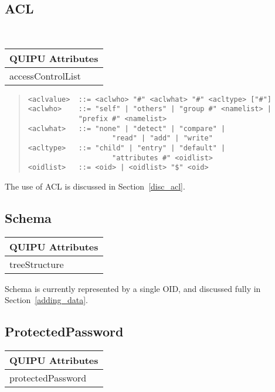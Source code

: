 \subsection{ACL}
\label{acl_syntax}
\
\begin{center}\small
\begin{tabular}{|l|}\hline
QUIPU Attributes \\ \hline
	accessControlList\\
\hline
\end{tabular}
\end{center}
\begin{quote}\begin{verbatim}
<aclvalue>	::= <aclwho> "#" <aclwhat> "#" <acltype> ["#"]
<aclwho>	::= "self" | "others" | "group #" <namelist> | 
			"prefix #" <namelist>
<aclwhat>	::= "none" | "detect" | "compare" | 
                    "read" | "add" | "write"
<acltype>	::= "child" | "entry" | "default" | 
                    "attributes #" <oidlist>
<oidlist>	::= <oid> | <oidlist> "$" <oid>
\end{verbatim}\end{quote}
The use of ACL is discussed in Section~\ref{disc_acl}.

\subsection{Schema}
\label{tree_struct}
\begin{center}\small
\begin{tabular}{|l|}\hline
QUIPU Attributes \\ \hline
	treeStructure\\
\hline
\end{tabular}
\end{center}
Schema is currently represented by a single OID, and discussed fully in
Section~\ref{adding_data}.

\subsection{ProtectedPassword}
\begin{center}\small
\begin{tabular}{|l|}\hline
QUIPU Attributes \\ \hline
	protectedPassword\\
\hline
\end{tabular}
\end{center}

